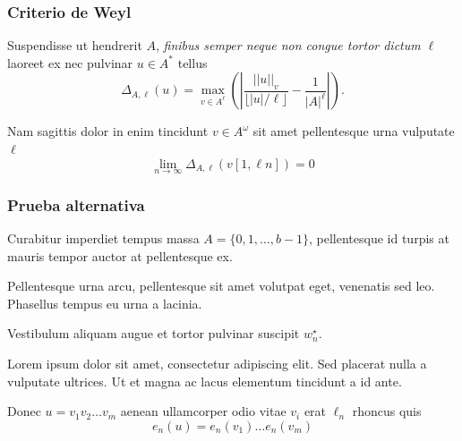\documentclass[t, 10pt, mathserif]{beamer}
\newcommand{\alocc}[2]{|\!|#1|\!|_{#2}}
\begin{document}
\begin{frame}
  \frametitle{Criterio de Weyl}

  \medskip
  \begin{definition}
    Suspendisse ut hendrerit $A$,  \textit{finibus semper neque non congue tortor dictum $\ell$} laoreet ex nec pulvinar $u\in A^*$ tellus
    \begin{equation*}
      \Delta_{A,\ell}(u) = 
      \max_{v \in A^{\ell}}\left(\left|\frac{\alocc{u}{v}}{\lfloor|u|/\ell \rfloor} - \frac{1}{|A|^{\ell}}\right|\right).
    \end{equation*}
  \end{definition}
  \pause

  Nam sagittis dolor in enim tincidunt $v\in A^\omega$ sit amet pellentesque urna vulputate $\ell$
  $$\lim_{n \rightarrow \infty} \Delta_{A, \ell}(v[1,\ell n]) = 0$$
\end{frame}



\begin{frame}
  \frametitle{Prueba alternativa}

  \medskip
  \begin{definition}
    Curabitur imperdiet tempus massa $A=\{0,1, \ldots, b-1\}$, pellentesque id turpis at mauris tempor auctor at pellentesque ex.
    \pause

    Pellentesque urna arcu, pellentesque sit amet volutpat eget, venenatis sed leo. Phasellus tempus eu urna a lacinia.
    \pause

    Vestibulum aliquam augue et tortor pulvinar suscipit $w^{\star}_n$.
    \pause

    Lorem ipsum dolor sit amet, consectetur adipiscing elit. Sed placerat nulla a vulputate ultrices. Ut et magna ac lacus elementum tincidunt a id ante.

    {\color{magenta}
      Donec $u=v_1 v_2 \ldots v_m$ aenean ullamcorper odio vitae $v_i$ erat $\ell_n$  rhoncus quis
      \[
      e_n(u)=e_n(v_1)\ldots e_n(v_m)
      \]
    }
  \end{definition}
\end{frame}

\end{document}
